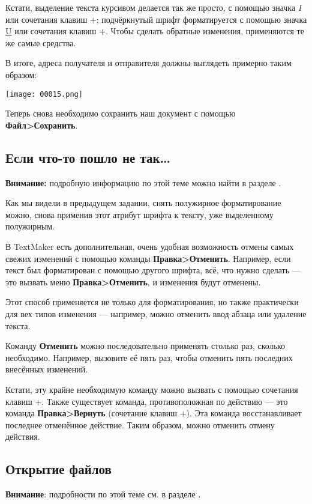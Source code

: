 ﻿\documentclass[a4paper,10pt]{article}
\begin{document}
Кстати, выделение текста курсивом делается так же просто, с помощью значка \textit{I} или сочетания клавиш +; подчёркнутый шрифт форматируется с помощью значка \underline{U} или сочетания клавиш +. Чтобы сделать обратные  изменения, применяются те же самые средства.

В итоге, адреса получателя и отправителя должны выглядеть примерно таким образом:

\texttt{[image: 00015.png]}

Теперь снова необходимо сохранить наш документ с помощью \textbf{Файл>Сохранить}.

\subsection{Если что-то пошло не так…}
\textbf{Внимание:} подробную информацию по этой теме можно найти в разделе .

Как мы видели в предыдущем задании, снять полужирное форматирование можно, снова применив этот атрибут шрифта к тексту, уже выделенному полужирным.

В TextMaker есть дополнительная, очень удобная возможность отмены самых свежих изменений с помощью команды \textbf{Правка>Отменить}. Например, если текст был форматирован с помощью другого шрифта, всё, что нужно сделать — это вызвать меню \textbf{Правка>Отменить}, и изменения будут отменены.

Этот способ применяется не только для форматирования, но также практически для вех типов изменения — например, можно отменить ввод абзаца или удаление текста.

Команду \textbf{Отменить} можно последовательно применять столько раз, сколько необходимо. Например, вызовите её пять раз, чтобы отменить пять последних внесённых изменений.

Кстати, эту крайне необходимую команду можно вызвать с помощью сочетания клавиш +.
Также существует команда, противоположная по действию — это команда \textbf{Правка>Вернуть} (сочетание клавиш +). Эта команда восстанавливает последнее отменённое действие. Таким образом, можно отменить отмену действия.

\subsection{Открытие файлов}
\textbf{Внимание}: подробности по этой теме см. в разделе .
\end{document}
